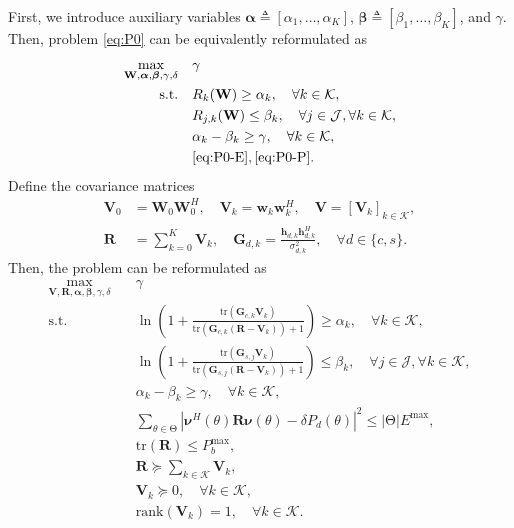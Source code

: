 \documentclass[runningheads]{llncs}
\begin{document}
First, we introduce auxiliary variables $\boldsymbol{\alpha} \triangleq [\alpha_1,\dots,\alpha_K]$, $\boldsymbol{\beta} \triangleq [\beta_1,\dots,\beta_K]$,  and $\gamma$.  Then, problem \eqref{eq:P0} can be equivalently reformulated as
\begin{subequations}
\begin{align}
\max_{\mathbf{W}, \boldsymbol{\alpha}, \boldsymbol{\beta}, \gamma, \delta} \quad 
& \gamma \\
\text{s.t.} \quad 
& R_k(\mathbf{W}) \ge \alpha_k, \quad \forall k \in \mathcal{K}, \\
& R_{j,k}(\mathbf{W}) \le \beta_k, \quad  \forall j \in \mathcal{J}, \forall k \in \mathcal{K},\\
& \alpha_k - \beta_k \ge \gamma, \quad \forall k \in \mathcal{K}, \\
& \eqref{eq:P0-E}, \eqref{eq:P0-P}.
\end{align}
\end{subequations}
Define the covariance matrices
\begin{align}
\mathbf{V}_0 &= \mathbf{W}_0 \mathbf{W}_0^H, \quad
\mathbf{V}_k = \mathbf{w}_k \mathbf{w}_k^H, \quad \mathbf{V} = [\mathbf{V}_k]_{k \in \mathcal{K}}, \\
\mathbf{R} &= \sum_{k=0}^{K} \mathbf{V}_k, \quad
\mathbf{G}_{d, k} = \frac{\mathbf{h}_{d,k} \mathbf{h}_{d,k} ^H}{\sigma_{d,k}^2}, \quad \forall d \in \{c,s\}.
\end{align}
%
Then, the problem can be reformulated as
\begin{subequations}
\label{eq:P1}
\begin{align}
\max_{\mathbf{V}, \mathbf{R}, \boldsymbol{\alpha}, \boldsymbol{\beta}, \gamma, \delta} \quad 
& \gamma \\
\text{s.t.} \quad \quad \
& \ln \! \left(1 + \frac{\mathrm{tr}(\mathbf{G}_{c,k} \mathbf{V}_k)}
{\mathrm{tr}(\mathbf{G}_{c, k} (\mathbf{R} -  \mathbf{V}_k)) + 1} \right) \ge \alpha_k , \quad \forall k \in \mathcal{K}, \label{eq:P1-alpha} \\
& \ln \! \left(1 + \frac{\mathrm{tr}(\mathbf{G}_{s, j} \mathbf{V}_k)}
{\mathrm{tr}(\mathbf{G}_{s, j} (\mathbf{R} - \mathbf{V}_k))  + 1} \right) \le \beta_k, \quad \forall j \in \mathcal{J}, \forall k \in \mathcal{K}, \label{eq:P1-beta} \\
& \alpha_k - \beta_k \ge \gamma, \quad \forall k \in \mathcal{K}, \label{eq:P1-gamma} \\
& \sum_{\theta \in \mathrm{\Theta} } \left| \boldsymbol{\nu}^H (\theta) \mathbf{R} \boldsymbol{\nu}(\theta) - \delta P_d(\theta) \right|^2 \le | \mathrm{\Theta}  | E^{\max}, \label{eq:P1-E} \\
& \mathrm{tr} (\mathbf{R}) \le P_b^{\max}, \label{eq:P1-P} \\
& \mathbf{R} \succeq \sum_{k \in \mathcal{K}} \mathbf{V}_k, \label{eq:P1-R} \\
& \mathbf{V}_k \succeq 0, \quad \forall k \in \mathcal{K}, \label{eq:P1-V} \\
& \mathrm{rank}(\mathbf{V}_k) = 1, \quad \forall k \in \mathcal{K}. \label{eq:P1-rank}
\end{align}
\end{subequations}
\end{document}
